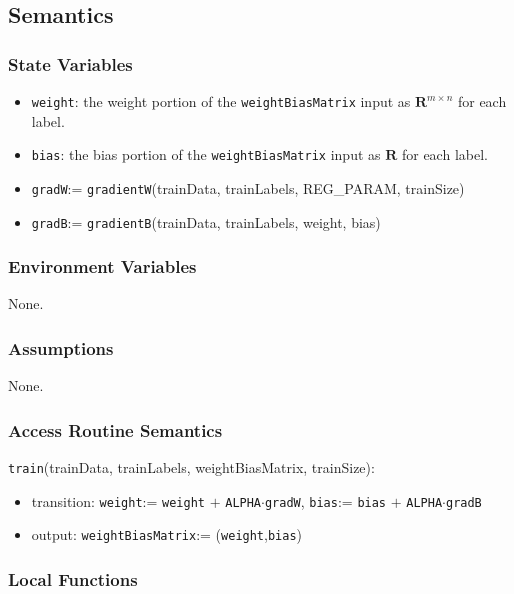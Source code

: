 \documentclass[12pt, titlepage]{article}
\def\code#1{\texttt{#1}}
\begin{document}
\subsection{Semantics}

\subsubsection{State Variables}

\begin{itemize}
\item \code{weight}: the weight portion of the \code{weightBiasMatrix} input as $\mathbf{R}^{m \times n}$ for each label.
\item \code{bias}: the bias portion of the \code{weightBiasMatrix} input as $\mathbf{R}$ for each label.
\item \code{gradW}:= \code{gradientW}(trainData, trainLabels, REG\_PARAM, trainSize)
\item \code{gradB}:= \code{gradientB}(trainData, trainLabels, weight, bias)
\end{itemize}

\subsubsection{Environment Variables}

None.

\subsubsection{Assumptions}

None.

\subsubsection{Access Routine Semantics}

\noindent \code{train}(trainData, trainLabels, weightBiasMatrix, trainSize):
\begin{itemize}
\item transition: \code{weight}:= \code{weight} $+$ \code{ALPHA}$\cdot$\code{gradW}, 
\code{bias}:= \code{bias} $+$ \code{ALPHA}$\cdot$\code{gradB}
\item output: \code{weightBiasMatrix}:= (\code{weight},\code{bias})
\end{itemize}

\subsubsection{Local Functions}
\end{document}
